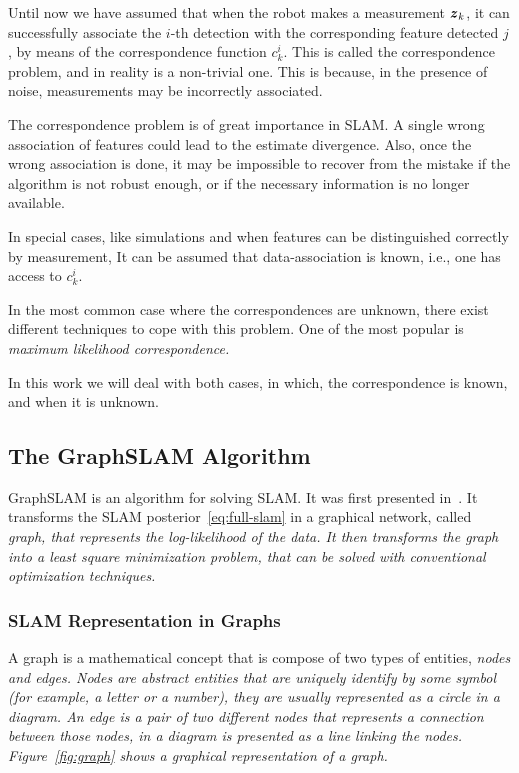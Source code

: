 Until now we have assumed that when the robot makes a measurement $\boldsymbol{z}_k$, it can successfully associate the $i$-th detection with the corresponding feature detected $j$, by means of the correspondence function $c_k^i$. This is called the correspondence problem, and in reality is a non-trivial one. This is because, in the presence of noise, measurements may be incorrectly associated. 

The correspondence problem is of great importance in SLAM. A single wrong association of features could lead to the estimate divergence. Also, once the wrong association is done, it may be impossible to recover from the mistake if the algorithm is not robust enough, or if the necessary information is no longer available.

In special cases, like simulations and when features can be distinguished correctly by measurement, It can be assumed that data-association is known, i.e., one has access to $c_k^i$. 

In the most common case where the correspondences are unknown, there exist different techniques to cope with this problem. One of the most popular is \it{maximum likelihood correspondence}.

In this work we will deal with both cases, in which, the correspondence is known, and when it is unknown.

\subsection{The GraphSLAM Algorithm}
\label{sec:graphslam-description}

GraphSLAM is an algorithm for solving SLAM. It was first presented in~\cite{graphslam}. It transforms the SLAM posterior~\eqref{eq:full-slam} in a graphical network, called \it{graph}, that represents the log-likelihood of the data. It then transforms the graph into a least square minimization problem, that can be solved with conventional optimization techniques.

\subsubsection{SLAM Representation in Graphs}

A graph is a mathematical concept that is compose of two types of entities, \it{nodes} and \it{edges}. Nodes are abstract entities that are uniquely identify by some symbol (for example, a letter or a number), they are usually represented as a circle in a diagram. An edge is a pair of two different nodes that represents a connection between those nodes, in a diagram is presented as a line linking the nodes. Figure~\ref{fig:graph} shows a graphical representation of a graph.

